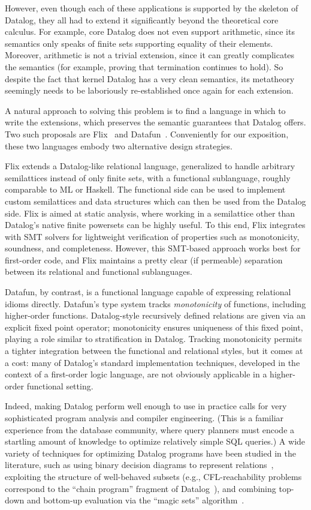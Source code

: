 However, even though each of these applications is supported by the skeleton of
Datalog, they all had to extend it significantly beyond the theoretical core
calculus. For example, core Datalog does not even support arithmetic, since its
semantics only speaks of finite sets supporting equality of their elements.
Moreover, arithmetic is not a trivial extension, since it can greatly
complicates the semantics (for example, proving that termination continues to
hold). So despite the fact that kernel Datalog has a very clean semantics, its
metatheory seemingly needs to be laboriously re-established once again for each
extension.

A natural approach to solving this problem is to find a language in which to
write the extensions, which preserves the semantic guarantees that Datalog
offers. Two such proposals are Flix~\cite{flix} and Datafun~\cite{datafun}.
Conveniently for our exposition, these two languages embody two alternative
design strategies.

Flix extends a Datalog-like relational language, generalized to handle arbitrary
semilattices instead of only finite sets, with a functional sublanguage, roughly
comparable to ML or Haskell. The functional side can be used to implement custom
semilattices and data structures which can then be used from the Datalog side.
Flix is aimed at static analysis, where working in a semilattice other than
Datalog's native finite powersets can be highly useful. To this end, Flix
integrates with SMT solvers for lightweight verification of properties such as
monotonicity, soundness, and completeness. However, this SMT-based approach
works best for first-order code, and Flix maintains a pretty clear (if
permeable) separation between its relational and functional sublanguages.

Datafun, by contrast, is a functional language capable of expressing relational
idioms directly.
%
Datafun's type system tracks \emph{monotonicity} of functions, including
higher-order functions.
%
Datalog-style recursively defined relations are given via an explicit fixed
point operator; monotonicity ensures uniqueness of this fixed point, playing a
role similar to stratification in Datalog.
%
Tracking monotonicity permits a tighter integration between the functional and
relational styles, but it comes at a cost: many of Datalog's standard
implementation techniques, developed in the context of a first-order logic
language, are not obviously applicable in a higher-order functional setting.

Indeed, making Datalog perform well enough to use in practice calls for very
sophisticated program analysis and compiler engineering. (This is a familiar
experience from the database community, where query planners must encode a
startling amount of knowledge to optimize relatively simple SQL queries.) A wide
variety of techniques for optimizing Datalog programs have been studied in the
literature, such as using binary decision diagrams to represent
relations~\cite{whaley-phd}, exploiting the structure of well-behaved subsets
(e.g., CFL-reachability problems correspond to the ``chain program'' fragment of
Datalog~\cite{chain-programs}), and combining top-down and bottom-up evaluation
via the ``magic sets'' algorithm~\cite{magic-sets}.

